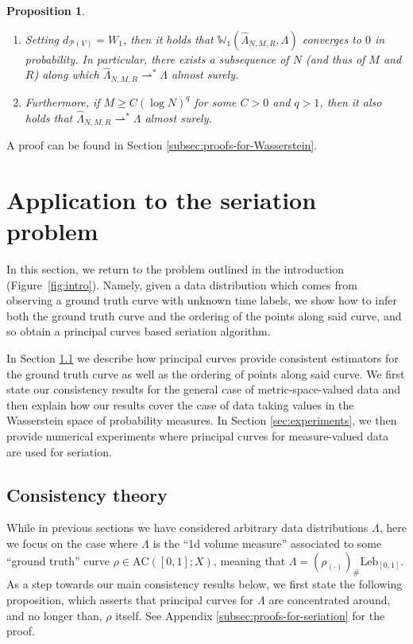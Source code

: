 \documentclass[aos, preprint]{imsart}
\theoremstyle{plain}
\newtheorem{prop}[theorem]{Proposition}
\theoremstyle{remark}
\begin{document}
{\begin{prop}
\begin{enumerate}
\item Setting $d_{\mathcal{P}(V)}=W_{1}$,
then it holds that $\mathbb{W}_{1}(\hat{\Lambda}_{N,M,R},\Lambda)$
converges to $0$ in probability. In particular, there exists a subsequence
of $N$ (and thus of $M$ and $R$) along which $\hat{\Lambda}_{N,M,R}\rightharpoonup^{*}\Lambda$
almost surely.

\item Furthermore, if $M\geq C(\log N)^{q}$ for some $C>0$ and $q>1$,
then it also holds that $\hat{\Lambda}_{N,M,R} \rightharpoonup^* \Lambda$ almost surely.
\end{enumerate}
\end{prop}

A proof can be found in Section \ref{subsec:proofs-for-Wasserstein}.



\section{Application to the seriation problem}\label{sec:seriation}

In this section, we return to the problem outlined in the introduction (Figure~\ref{fig:intro}).
Namely, given a data distribution which comes from observing a ground truth curve with unknown time labels, we show how to infer both the ground truth curve and the ordering of the points along said curve, and so obtain a principal curves based seriation algorithm.

In Section \ref{subsec:consistency} we describe how principal curves provide consistent estimators for the ground truth curve as well as the ordering of points along said curve. We first state our consistency results for the general case of metric-space-valued data and then explain how our results cover the case of data taking values in the Wasserstein space of probability measures. In Section \ref{sec:experiments}, we then provide  numerical experiments where principal curves for measure-valued data are used for seriation.

\subsection{Consistency theory}
\label{subsec:consistency}

While in previous sections we have considered arbitrary data distributions $\Lambda$, here we focus on the case where $\Lambda$ is the ``1d volume measure''
associated to some ``ground truth'' curve $\rho\in\text{AC}([0,1];X)$,
meaning that $\Lambda=(\rho_{(\cdot)})_{\#}\text{Leb}_{[0,1]}$.
As a step towards our main consistency results below, we first state the following proposition, which asserts that principal curves for $\Lambda$ are concentrated around, and no longer than, $\rho$ itself. See Appendix \ref{subsec:proofs-for-seriation} for the proof.

}
\end{document}
